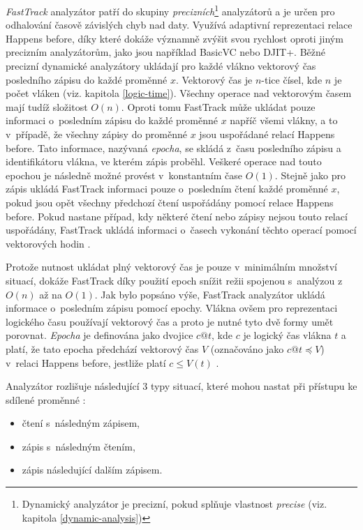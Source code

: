 \textit{FastTrack} \cite{cite:ft} analyzátor patří do skupiny \textit{precizních}\footnote{Dynamický analyzátor je precizní, pokud splňuje vlastnost \textit{precise} (viz. kapitola \ref{dynamic-analysis})} analyzátorů a je určen pro odhalování časově závislých chyb nad daty. Využívá adaptivní reprezentaci relace Happens before, díky které dokáže významně zvýšit svou rychlost oproti jiným precizním analyzátorům, jako jsou například BasicVC nebo DJIT+. Běžné precizní dynamické analyzátory ukládají pro každé vlákno vektorový čas posledního zápisu do každé proměnné $x$. Vektorový čas je $n$-tice čísel, kde $n$ je počet vláken (viz. kapitola \ref{logic-time}). Všechny operace nad vektorovým časem mají tudíž složitost $O(n)$. Oproti tomu FastTrack může ukládat pouze informaci o~posledním zápisu do každé proměnné $x$ napříč všemi vlákny, a to v~případě, že všechny zápisy do proměnné $x$ jsou uspořádané relací Happens before. Tato informace, nazývaná \textit{epocha}, se skládá z~času posledního zápisu a identifikátoru vlákna, ve kterém zápis proběhl. Veškeré operace nad touto epochou je následně možné provést v~konstantním čase $O(1)$. Stejně jako pro zápis ukládá FastTrack informaci pouze o~posledním čtení každé proměnné $x$, pokud jsou opět všechny předchozí čtení uspořádány pomocí relace Happens before. Pokud nastane případ, kdy některé čtení nebo zápisy nejsou touto relací uspořádány, FastTrack ukládá informaci o~časech vykonání těchto operací pomocí vektorových hodin \cite{cite:ft}.

Protože nutnost ukládat plný vektorový čas je pouze v~minimálním množství situací, dokáže FastTrack díky použití epoch snížit režii spojenou s~analýzou z~$O(n)$ až na $O(1)$. Jak bylo popsáno výše, FastTrack analyzátor ukládá informace o~posledním zápisu pomocí epochy. Vlákna ovšem pro reprezentaci logického času používají vektorový čas a proto je nutné tyto dvě formy umět porovnat. \textit{Epocha} je definována jako dvojice $c@t$, kde $c$ je logický čas vlákna $t$ a platí, že tato epocha předchází vektorový čas $V$ (označováno jako $c@t \preceq V$) v~relaci Happens before, jestliže platí $c\leq V(t)$ \cite{cite:ft}. 

Analyzátor rozlišuje následující 3 typy situací, které mohou nastat při přístupu ke sdílené proměnné \cite{cite:ft}:
\begin{itemize}
\item čtení s~následným zápisem,
\item zápis s~následným čtením,
\item zápis následující dalším zápisem.
\end{itemize}

